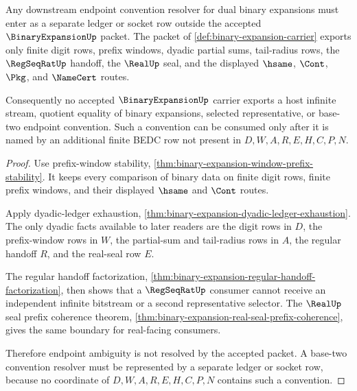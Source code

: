 \begin{theorem}
\label{thm:binary-expansion-endpoint-ambiguity-ledger-boundary}
Any downstream endpoint convention resolver for dual binary expansions must enter as a separate ledger or socket row outside the accepted $\BinaryExpansionUp$ packet. The packet of \autoref{def:binary-expansion-carrier} exports only finite digit rows, prefix windows, dyadic partial sums, tail-radius rows, the $\RegSeqRatUp$ handoff, the $\RealUp$ seal, and the displayed $\hsame$, $\Cont$, $\Pkg$, and $\NameCert$ routes.

Consequently no accepted $\BinaryExpansionUp$ carrier exports a host infinite stream, quotient equality of binary expansions, selected representative, or base-two endpoint convention. Such a convention can be consumed only after it is named by an additional finite BEDC row not present in $D,W,A,R,E,H,C,P,N$.
\end{theorem}
\begin{proof}
Use prefix-window stability, \autoref{thm:binary-expansion-window-prefix-stability}. It keeps every comparison of binary data on finite digit rows, finite prefix windows, and their displayed $\hsame$ and $\Cont$ routes.

Apply dyadic-ledger exhaustion, \autoref{thm:binary-expansion-dyadic-ledger-exhaustion}. The only dyadic facts available to later readers are the digit rows in $D$, the prefix-window rows in $W$, the partial-sum and tail-radius rows in $A$, the regular handoff $R$, and the real-seal row $E$.

The regular handoff factorization, \autoref{thm:binary-expansion-regular-handoff-factorization}, then shows that a $\RegSeqRatUp$ consumer cannot receive an independent infinite bitstream or a second representative selector. The $\RealUp$ seal prefix coherence theorem, \autoref{thm:binary-expansion-real-seal-prefix-coherence}, gives the same boundary for real-facing consumers.

Therefore endpoint ambiguity is not resolved by the accepted packet. A base-two convention resolver must be represented by a separate ledger or socket row, because no coordinate of $D,W,A,R,E,H,C,P,N$ contains such a convention.
\end{proof}

